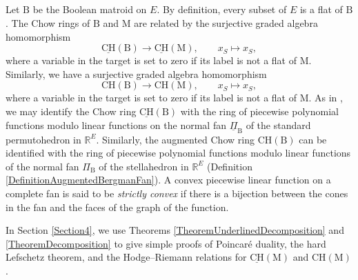 \documentclass[11pt,reqno]{amsart}
\theoremstyle{definition}
\theoremstyle{remark}
\renewcommand{\(}{\left(}
\renewcommand{\)}{\right)}
\newcommand{\<}{\left<}
\renewcommand{\>}{\right>}
\begin{document}
\subsection{} 
Let $\mathrm{B}$ be the Boolean matroid on $E$.
By definition, every subset of $E$ is a flat of $\mathrm{B}$.
The Chow rings of $\mathrm{B}$ and $\mathrm{M}$ are related by
the surjective graded algebra homomorphism
\[
\underline{\mathrm{CH}}(\mathrm{B}) \longrightarrow \underline{\mathrm{CH}}(\mathrm{M}), \qquad x_S \longmapsto x_S,
\]
where a variable in the target is set to zero if its label is not a flat of $\mathrm{M}$. Similarly,
we have a surjective graded algebra homomorphism
\[
\mathrm{CH}(\mathrm{B}) \longrightarrow \mathrm{CH}(\mathrm{M}), \qquad x_S \longmapsto x_S,
\]
where a variable in the target is set to zero if its label is not a flat of $\mathrm{M}$.
As in \cite[Section 4]{AHK}, we may identify the Chow ring $\underline{\mathrm{CH}}(\mathrm{B})$ with the ring of piecewise polynomial functions modulo linear functions on the normal fan  $\underline{\Pi}_\mathrm{B}$ of the standard permutohedron in $\mathbb{R}^E$.
Similarly, the augmented Chow ring $\mathrm{CH}(\mathrm{B})$ can be identified 
with the ring of piecewise polynomial functions modulo linear functions of the normal fan $\Pi_\mathrm{B}$ of the stellahedron in $\mathbb{R}^E$ (Definition \ref{DefinitionAugmentedBergmanFan}).
A convex piecewise linear function on a complete fan is said to be \emph{strictly convex} if there is a bijection between the cones in the fan and the faces of the graph of the function.

In Section \ref{Section4}, we use Theorems \ref{TheoremUnderlinedDecomposition} and \ref{TheoremDecomposition} to give simple proofs of Poincar\'e duality, the hard Lefschetz theorem, and the Hodge--Riemann relations for  $\underline{\mathrm{CH}}(\mathrm{M})$ and $\mathrm{CH}(\mathrm{M})$.
\end{document}
